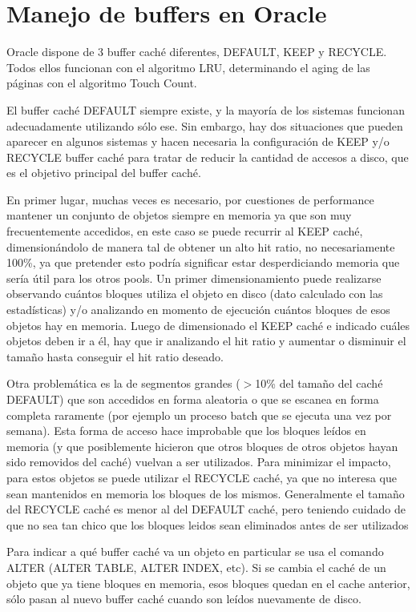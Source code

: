\documentclass[a4paper,10pt]{article}
\begin{document}
 \newpage

\section{Manejo de buffers en Oracle}

Oracle dispone de 3 buffer caché diferentes, DEFAULT, KEEP y RECYCLE. Todos ellos funcionan con el algoritmo LRU, determinando el aging de las páginas con el algoritmo Touch Count.

El buffer caché DEFAULT siempre existe, y la mayoría de los sistemas funcionan adecuadamente utilizando sólo ese. Sin embargo, hay dos situaciones que pueden aparecer en algunos sistemas y hacen necesaria la configuración de KEEP y/o RECYCLE buffer caché para tratar de reducir la cantidad de accesos a disco, que es el objetivo principal del buffer caché.

En primer lugar, muchas veces es necesario, por cuestiones de performance mantener un conjunto de objetos siempre en memoria ya que son muy frecuentemente accedidos, en este caso se puede recurrir al KEEP caché, dimensionándolo de manera tal de obtener un alto hit ratio, no necesariamente 100\%, ya que pretender esto podría significar estar desperdiciando memoria que sería útil para los otros pools. Un primer  dimensionamiento puede realizarse observando cuántos bloques utiliza el objeto en disco (dato calculado con las estadísticas) y/o analizando en momento de ejecución cuántos bloques de esos objetos hay en memoria. Luego de dimensionado el KEEP caché e indicado cuáles objetos deben ir a él, hay que ir analizando el hit ratio y aumentar o disminuir el tamaño hasta conseguir el hit ratio deseado.

Otra problemática es la de segmentos grandes ($>$10\% del tamaño del caché DEFAULT) que son accedidos en forma aleatoria o que se escanea en forma completa raramente (por ejemplo un proceso batch que se ejecuta una vez por semana). Esta forma de acceso hace  improbable que los bloques leídos en memoria (y que posiblemente hicieron que otros bloques de otros objetos hayan sido removidos del caché) vuelvan a ser utilizados. Para minimizar el impacto, para estos objetos se puede utilizar el RECYCLE caché, ya que no interesa que sean mantenidos en memoria los bloques de los mismos. Generalmente el tamaño del RECYCLE caché es menor al del DEFAULT caché, pero teniendo cuidado de que no sea tan chico que los bloques leidos sean eliminados antes de ser utilizados

Para indicar a qué buffer caché va un objeto en particular se usa el comando ALTER (ALTER TABLE, ALTER INDEX, etc). Si se cambia el caché de un objeto que ya tiene bloques en memoria, esos bloques quedan en el cache anterior, sólo pasan al nuevo buffer caché cuando son leídos nuevamente de disco.
\end{document}
